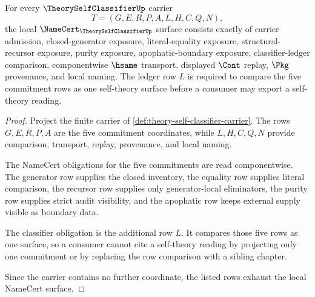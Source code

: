 \begin{theorem}
\label{thm:theory-self-classifier-namecert-obligations}
For every $\TheorySelfClassifierUp$ carrier
$$
T=(G,E,R,P,A,L,H,C,Q,N),
$$
the local $\NameCert_{\TheorySelfClassifierUp}$ surface consists exactly of carrier admission, closed-generator exposure, literal-equality exposure, structural-recursor exposure, purity exposure, apophatic-boundary exposure, classifier-ledger comparison, componentwise $\hsame$ transport, displayed $\Cont$ replay, $\Pkg$ provenance, and local naming. The ledger row $L$ is required to compare the five commitment rows as one self-theory surface before a consumer may export a self-theory reading.
\end{theorem}
\begin{proof}
Project the finite carrier of \autoref{def:theory-self-classifier-carrier}. The rows $G,E,R,P,A$ are the five commitment coordinates, while $L,H,C,Q,N$ provide comparison, transport, replay, provenance, and local naming.

The NameCert obligations for the five commitments are read componentwise. The generator row supplies the closed inventory, the equality row supplies literal comparison, the recursor row supplies only generator-local eliminators, the purity row supplies strict audit visibility, and the apophatic row keeps external supply visible as boundary data.

The classifier obligation is the additional row $L$. It compares those five rows as one surface, so a consumer cannot cite a self-theory reading by projecting only one commitment or by replacing the row comparison with a sibling chapter.

Since the carrier contains no further coordinate, the listed rows exhaust the local NameCert surface.
\end{proof}

